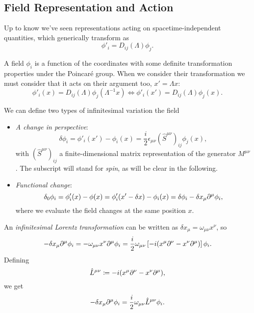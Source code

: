 \subsection{Field Representation and Action}
Up to know we've seen representations acting on spacetime-independent quantities, which generically transform as
\begin{equation}
    \phi'_i  = D_{ij}(\Lambda) \phi_j.
\end{equation}

A field $\phi_i$ is a function of the coordinates with some definite transformation properties under the Poincaré group. When we consider their transformation we must consider that it acts on their argument too, $x' = \Lambda x$:
\begin{equation}
    \phi'_i (x) = D_{ij}(\Lambda) \phi_j(\Lambda^{-1}x) \iff \phi'_i(x') = D_{ij}(\Lambda) \phi_j(x) .
\end{equation}

We can define two types of infinitesimal variation the field
\begin{itemize}
    \item \emph{A change in perspective}:
    \begin{equation}
        \delta \phi_i = \phi'_i(x') - \phi_i(x) = \frac{i}{2} \epsilon_{\mu\nu} (\hat{S}^{\mu\nu})_{ij} \phi_j(x) ,
    \end{equation}
    with $(\hat{S}^{\mu\nu})_{ij}$ a finite-dimensional matrix representation of the generator $M^{\mu\nu}$. The subscript will stand for \emph{spin}, as will be clear in the following.
    \item \emph{Functional change}:
    \begin{equation}\label{eq:total-functional-variation}
        \delta_0 \phi_i = \phi'_i(x) - \phi(x) = \phi'_i (x' - \delta x) - \phi_i(x) = \delta \phi_i - \delta x_\mu \partial^\mu \phi_i ,
    \end{equation}
    where we evaluate the field changes at the same position $x$.
\end{itemize}

An \emph{infinitesimal Lorentz transformation} can be written as $\delta x_\mu = \omega_{\mu\nu} x^\nu$, so
\begin{equation*}
    -\delta x_\mu \partial^\mu \phi_i = - \omega_{\mu\nu} x^\nu \partial^\mu \phi_i = \frac{i}{2} \omega_{\mu\nu} \left[ -i (x^\mu \partial^\nu - x^\nu \partial^\mu) \right] \phi_i .
\end{equation*} 
Defining
\begin{equation}
    {\hat{L}}^{\mu\nu} \coloneq -i (x^\mu \partial^\nu - x^\nu \partial^\mu),
\end{equation}
we get
\begin{equation}
    -\delta x_\mu \partial^\mu \phi_i = \frac{i}{2} \omega_{\mu\nu} {\hat{L}}^{\mu\nu} \phi_i.
\end{equation}

